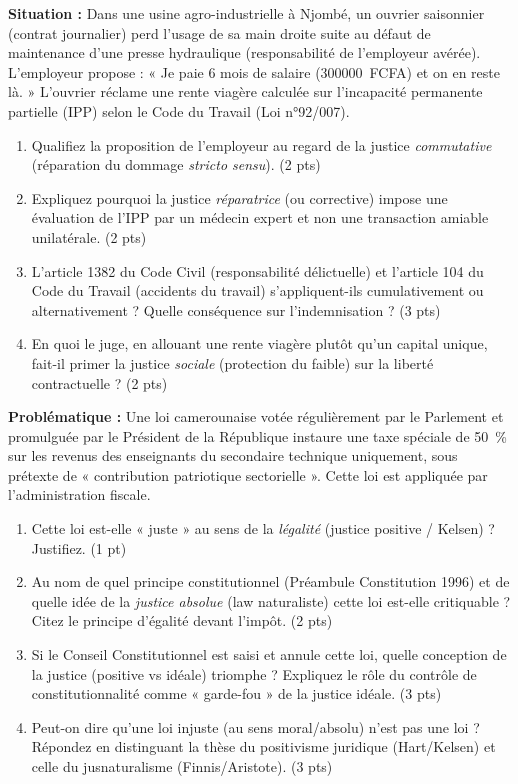 \documentclass[11pt]{article}
\begin{document}
\begin{exercice}
\textbf{Situation :} Dans une usine agro-industrielle à Njombé, un ouvrier saisonnier (contrat journalier) perd l'usage de sa main droite suite au défaut de maintenance d'une presse hydraulique (responsabilité de l'employeur avérée). L'employeur propose : « Je paie 6 mois de salaire (\SI{300000}{FCFA}) et on en reste là. » L'ouvrier réclame une rente viagère calculée sur l'incapacité permanente partielle (IPP) selon le Code du Travail (Loi n°92/007).
\begin{enumerate}
    \item Qualifiez la proposition de l'employeur au regard de la justice \textit{commutative} (réparation du dommage \textit{stricto sensu}). (2 pts)
    \item Expliquez pourquoi la justice \textit{réparatrice} (ou corrective) impose une évaluation de l'IPP par un médecin expert et non une transaction amiable unilatérale. (2 pts)
    \item L'article 1382 du Code Civil (responsabilité délictuelle) et l'article 104 du Code du Travail (accidents du travail) s'appliquent-ils cumulativement ou alternativement ? Quelle conséquence sur l'indemnisation ? (3 pts)
    \item En quoi le juge, en allouant une rente viagère plutôt qu'un capital unique, fait-il primer la justice \textit{sociale} (protection du faible) sur la liberté contractuelle ? (2 pts)
\end{enumerate}
\end{exercice}

\begin{exercice}
\textbf{Problématique :} Une loi camerounaise votée régulièrement par le Parlement et promulguée par le Président de la République instaure une taxe spéciale de \SI{50}{\%} sur les revenus des enseignants du secondaire technique uniquement, sous prétexte de « contribution patriotique sectorielle ». Cette loi est appliquée par l'administration fiscale.
\begin{enumerate}
    \item Cette loi est-elle « juste » au sens de la \textit{légalité} (justice positive / Kelsen) ? Justifiez. (1 pt)
    \item Au nom de quel principe constitutionnel (Préambule Constitution 1996) et de quelle idée de la \textit{justice absolue} (law naturaliste) cette loi est-elle critiquable ? Citez le principe d'égalité devant l'impôt. (2 pts)
    \item Si le Conseil Constitutionnel est saisi et annule cette loi, quelle conception de la justice (positive vs idéale) triomphe ? Expliquez le rôle du contrôle de constitutionnalité comme « garde-fou » de la justice idéale. (3 pts)
    \item Peut-on dire qu'une loi injuste (au sens moral/absolu) n'est pas une loi ? Répondez en distinguant la thèse du positivisme juridique (Hart/Kelsen) et celle du jusnaturalisme (Finnis/Aristote). (3 pts)
\end{enumerate}
\end{exercice}
\end{document}
